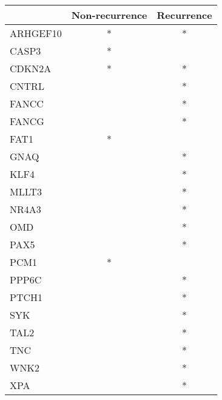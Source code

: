 \begin{tabular}{lcc}
\toprule
{} & Non-recurrence & Recurrence \\
\midrule
ARHGEF10 &              * &          * \\
CASP3    &              * &            \\
CDKN2A   &              * &          * \\
CNTRL    &                &          * \\
FANCC    &                &          * \\
FANCG    &                &          * \\
FAT1     &              * &            \\
GNAQ     &                &          * \\
KLF4     &                &          * \\
MLLT3    &                &          * \\
NR4A3    &                &          * \\
OMD      &                &          * \\
PAX5     &                &          * \\
PCM1     &              * &            \\
PPP6C    &                &          * \\
PTCH1    &                &          * \\
SYK      &                &          * \\
TAL2     &                &          * \\
TNC      &                &          * \\
WNK2     &                &          * \\
XPA      &                &          * \\
\bottomrule
\end{tabular}

